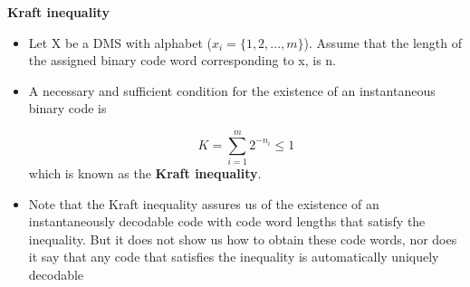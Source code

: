 \documentclass[a4]{beamer}
\begin{document}
\noindent \textbf{ Kraft inequality}
\begin{itemize}
\item Let X be a DMS with alphabet ($x _i = \{1, 2, . . . ,m\}$). Assume that the length of the assigned binary
code word corresponding to x, is n.
\item A necessary and sufficient condition for the existence of an instantaneous binary code is

 \[ K = \sum^{m}_{i=1}2^{-n_i} \leq 1 \]
which is known as the \textbf{Kraft inequality}.
\item Note that the Kraft inequality assures us of the existence of an instantaneously decodable code
with code word lengths that satisfy the inequality. But it does not show us how to obtain these code
words, nor does it say that any code that satisfies the inequality is automatically uniquely decodable
\end{itemize}
\end{document}
